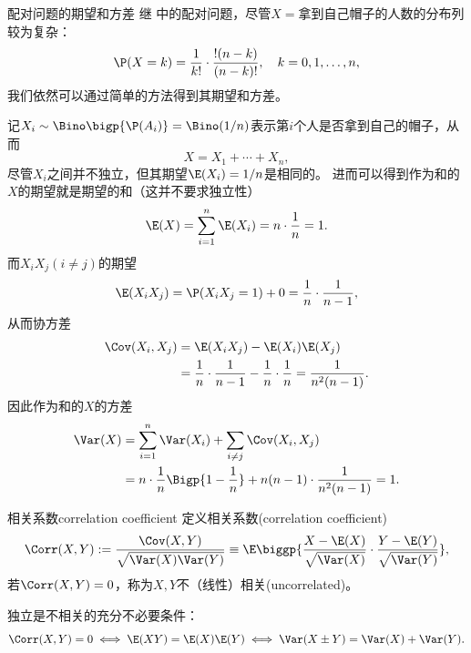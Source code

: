 \begin{example}{配对问题的期望和方差}{}
	继 中的配对问题，尽管$X=$拿到自己帽子的人数的分布列较为复杂：
	\begin{equation}
		\P(X=k)=\frac1{k!}\cdot\frac{!(n-k)}{(n-k)!},\quad k=0,1,\ldots,n,
	\end{equation}
	我们依然可以通过简单的方法得到其期望和方差。
	
	记$X_i\sim\Bino\bigp{\P(A_i)}=\Bino(1/n)$表示第$i$个人是否拿到自己的帽子，从而
	\[
		X=X_1+\cdots+X_n,
	\]
	尽管$X_i$之间并不独立，但其期望$\E(X_i)=1/n$是相同的。
	进而可以得到作为和的$X$的期望就是期望的和（这并不要求独立性）
	\begin{equation}
		\E(X)=\sum_{i=1}^n\E(X_i)=n\cdot\frac1n=1.
	\end{equation}
	而$X_iX_j(i\neq j)$的期望
	\[
		\E(X_iX_j)=\P(X_iX_j=1)+0=\frac1n\cdot\frac1{n-1},
	\]
	从而协方差
	\begin{equation}
		\begin{aligned}
			\Cov(X_i,X_j)&=\E(X_iX_j)-\E(X_i)\E(X_j)\\
			&=\frac1n\cdot\frac1{n-1}-\frac1n\cdot\frac1n=\frac1{n^2(n-1)}.
		\end{aligned}
	\end{equation}
	因此作为和的$X$的方差
	\begin{equation}
		\begin{aligned}
			\Var(X)&=\sum_{i=1}^n\Var(X_i)+\sum_{i\neq j}\Cov(X_i,X_j)\\
			&=n\cdot\frac1n\Bigp{1-\frac1n}+n(n-1)\cdot\frac1{n^2(n-1)}=1.
		\end{aligned}
	\end{equation}
\end{example}
\begin{definition}{相关系数}{correlation coefficient}
	定义相关系数(correlation coefficient)
	\begin{equation}
		\Corr(X,Y):=\frac{\Cov(X,Y)}{\sqrt{\Var(X)\Var(Y)}}\equiv\E\biggp{\frac{X-\E(X)}{\sqrt{\Var(X)}}\cdot\frac{Y-\E(Y)}{\sqrt{\Var(Y)}}},
	\end{equation}
	若$\Corr(X,Y)=0$，称为$X,Y$不（线性）相关(uncorrelated)。
\end{definition}

\begin{corollary}
	独立是不相关的充分不必要条件：
	\begin{equation}
		\Corr(X,Y)=0
		\iff\E(XY)=\E(X)\E(Y)
		\iff\Var(X\pm Y)=\Var(X)+\Var(Y).
	\end{equation}
\end{corollary}

